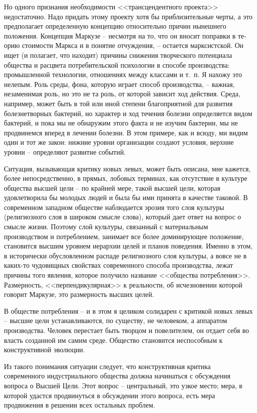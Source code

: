 \documentclass{book}
\begin{document}
Но одного признания необходимости <<трансцендентного проекта>> недостаточно. Надо придать этому проекту хотя бы приблизительные черты, а это предполагает определенную кон­цепцию относительно причин нынешнего положения. Концеп­ция Маркузе -- несмотря на то, что он вносит поправки в те­орию стоимости Маркса и в понятие отчуждения, -- остается марксистской. Он ищет (и полагает, что находит) причины снижения творческого потенциала общества и расцвета потре­бительской психологии в способе производства: промышлен­ной технологии, отношениях между классами и т.~п. Я нахожу это нелепым. Роль среды, фона, которую играет способ произ­водства, -- важная, незаменимая роль, но это не та роль, от ко­торой зависит ход действия. Среда, например, может быть в той или иной степени благоприятной для развития болезнетвор­ных бактерий, но характер и ход течения болезни определяется видом бактерий, и пока мы не обнаружим этого факта и не изучим бактерии, мы не продвинемся вперед в лечении болезни. В этом примере, как и всюду, ми 
видим один и тот же закон: нижние уровни организации создают условия, верхние уровни -- определяют развитие событий.

Ситуация, вызывающая критику новых левых, может быть описана, мне кажется, более непосредственно, в прямых, лобо­вых терминах, как отсутствие в культуре общества высшей це­ли -- по крайней мере, такой высшей цели, которая удовлетво­рила бы молодых людей и была бы ими принята в качестве та­ковой. В современном западном обществе наблюдается эрозия того слоя культуры (религиозного  слоя в широком смысле слова), который дает ответ на вопрос о смысле жизни. Поэто­му слой культуры, связанный с материальным производством и потреблением, занимает все более доминирующее положение, становится высшим уровнем иерархии целей и планов поведе­ния. Именно в этом, в исторически обусловленном распаде ре­лигиозного слоя культуры, а вовсе не в каких-то чудовищных свойствах современного способа производства, лежат причины того явления, которое получило название <<общества потребле­ния>>. Размерность, <<перпендикулярная>> к реальности, об исчез­новении которой говорит Маркузе, это размерность высших целей.

В обществе потребления -- и в этом я целиком солидарен с критикой новых левых -- высшие цели устанавливаются, по су­ществу, не человеком, а аппаратом производства. Человек пе­рестает быть творцом и повелителем, он отдает себя во власть созданной им самим среде. Общество становится неспособным к конструктивной эволюции.

Из такого понимания ситуации следует, что конструктивная критика современного индустриального общества должна на­чинаться с обсуждения вопроса о Высшей Цели. Этот вопрос -- центральный, это узкое место; мера, в которой удастся продви­нуться в обсуждении этого вопроса, есть мера продвижения в решении всех остальных проблем.
\end{document}
